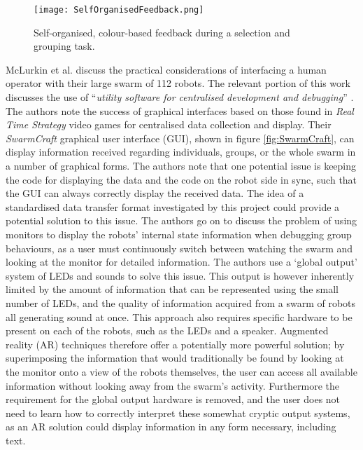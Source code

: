 \begin{figure}
 \begin{center}
 \texttt{[image: SelfOrganisedFeedback.png]}
 \decoRule
 \caption[Self Organised Feedback. \cite{Podevijn:2012}]{Self-organised, colour-based feedback during a selection and grouping task. \cite{Podevijn:2012}}
 \label{fig:SelfOrganisedFeedback}
 \end{center}
\end{figure}

McLurkin et al. \cite{McLurkin:2006} discuss the practical considerations of interfacing a human operator with their large swarm of 112 robots. The relevant portion of this work discusses the use of ``\textit{utility software for centralised development and debugging}'' \cite{McLurkin:2006}. The authors note the success of graphical interfaces based on those found in \textit{Real Time Strategy} video games for centralised data collection and display. Their \textit{SwarmCraft} graphical user interface (GUI), shown in figure \ref{fig:SwarmCraft}, can display information received regarding individuals, groups, or the whole swarm in a number of graphical forms. The authors note that one potential issue is keeping the code for displaying the data and the code on the robot side in sync, such that the GUI can always correctly display the received data. The idea of a standardised data transfer format investigated by this project could provide a potential solution to this issue. The authors go on to discuss the problem of using monitors to display the robots' internal state information when debugging group behaviours, as a user must continuously switch between watching the swarm and looking at the monitor for detailed information. The authors use a `global output' system of LEDs and sounds to solve this issue. This output is however inherently limited by the amount of information that can be represented using the small number of LEDs, and the quality of information acquired from a swarm of robots all generating sound at once. This approach also requires specific hardware to be present on each of the robots, such as the LEDs and a speaker. Augmented reality (AR) techniques therefore offer a potentially more powerful solution; by superimposing the information that would traditionally be found by looking at the monitor onto a view of the robots themselves, the user can access all available information without looking away from the swarm's activity. Furthermore the requirement for the global output hardware is removed, and the user does not need to learn how to correctly interpret these somewhat cryptic output systems, as an AR solution could display information in any form necessary, including text.

